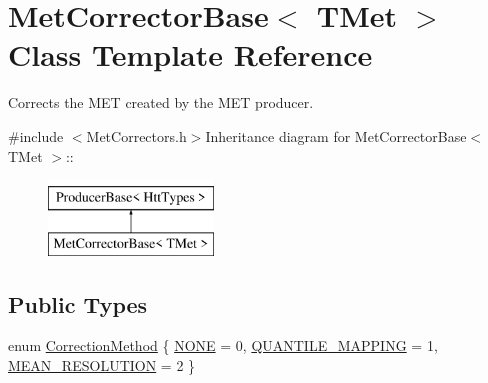 \hypertarget{classMetCorrectorBase}{
\section{MetCorrectorBase$<$ TMet $>$ Class Template Reference}
\label{classMetCorrectorBase}
}


Corrects the MET created by the MET producer.  


{\ttfamily \#include $<$MetCorrectors.h$>$}Inheritance diagram for MetCorrectorBase$<$ TMet $>$::\begin{figure}[H]
\begin{center}
\leavevmode
\includegraphics[height=2cm]{classMetCorrectorBase}
\end{center}
\end{figure}
\subsection*{Public Types}
\begin{DoxyCompactItemize}
\item 
enum \hyperlink{classMetCorrectorBase_a37bb26e946b22f52f1f358c7dd0bedfa}{CorrectionMethod} \{ \hyperlink{classMetCorrectorBase_a37bb26e946b22f52f1f358c7dd0bedfaac198e6341886c4ae59b4a309a168da33}{NONE} = 0, 
\hyperlink{classMetCorrectorBase_a37bb26e946b22f52f1f358c7dd0bedfaaaadedae30db7b716ab6b302d073c30b0}{QUANTILE\_\-MAPPING} = 1, 
\hyperlink{classMetCorrectorBase_a37bb26e946b22f52f1f358c7dd0bedfaa9f9f7d2ca81e1d7580b61f22ee6fc82b}{MEAN\_\-RESOLUTION} = 2
 \}
\end{DoxyCompactItemize}
